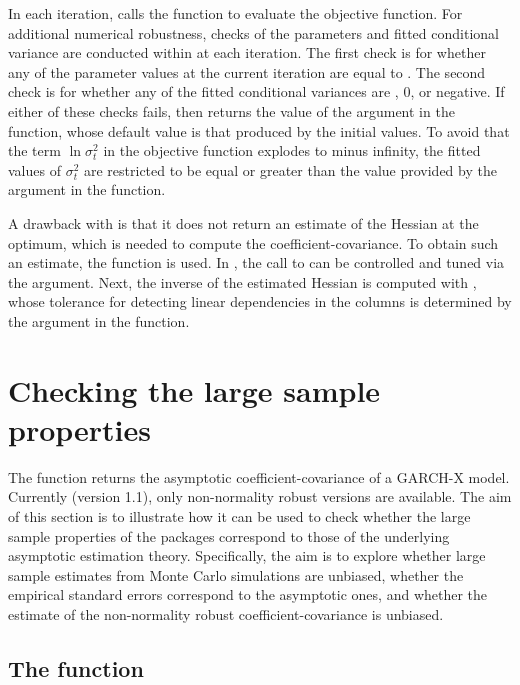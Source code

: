 In each iteration,  calls the function  to evaluate the objective function. For additional numerical robustness, checks of the parameters and fitted conditional variance are conducted within  at each iteration. The first check is for whether any of the parameter values at the current iteration are equal to . The second check is for whether any of the fitted conditional variances are , 0, or negative. If either of these checks fails, then  returns the value of the  argument in the  function, whose default value is that produced by the initial values. To avoid that the term $\ln\sigma_t^2$ in the objective function explodes to minus infinity, the fitted values of $\sigma_t^2$ are restricted to be equal or greater than the value provided by the  argument in the  function.
	
A drawback with  is that it does not return an estimate of the Hessian at the optimum, which is needed to compute the coefficient-covariance. To obtain such an estimate, the  function is used. In , the call to  can be controlled and tuned via the  argument. Next, the inverse of the estimated Hessian is computed with , whose tolerance for detecting linear dependencies in the columns is determined by the  argument in the  function.

\section{Checking the large sample properties}

The function  returns the asymptotic coefficient-covariance of a GARCH-X model. Currently (version 1.1), only non-normality robust versions are available. The aim of this section is to illustrate how it can be used to check whether the large sample properties of the packages correspond to those of the underlying asymptotic estimation theory. Specifically, the aim is to explore whether large sample estimates from Monte Carlo simulations are unbiased, whether the empirical standard errors correspond to the asymptotic ones, and whether the estimate of the non-normality robust coefficient-covariance is unbiased.

\subsection{The  function}

